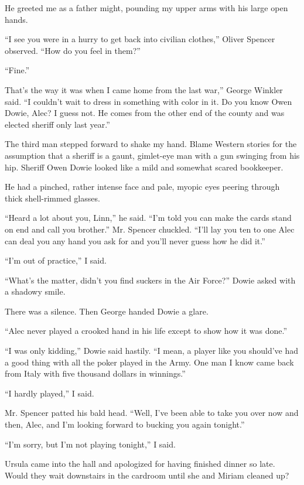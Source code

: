 \documentclass{novel}
\begin{document}
He greeted me as a father might, pounding my upper arms with his large open hands.

“I see you were in a hurry to get back into civilian clothes,” Oliver Spencer observed. “How do you feel in them?”

“Fine.”

That’s the way it was when I came home from the last war,” George Winkler said. “I couldn’t wait to dress in something with color in it. Do you know Owen Dowie, Alec? I guess not. He comes from the other end of the county and was elected sheriff only last year.”

\scenestars

The third man stepped forward to shake my hand. Blame Western stories for the assumption that a sheriff is a gaunt, gimlet-eye man with a gun swinging from his hip. Sheriff Owen Dowie looked like a mild and somewhat scared bookkeeper. 

He had a pinched, rather intense face and pale, myopic eyes peering through thick shell-rimmed glasses.

“Heard a lot about you, Linn,” he said. “I’m told you can make the cards stand on end and call you brother.” Mr. Spencer chuckled. “I’ll lay you ten to one Alec can deal you any hand you ask for and you’ll never guess how he did it.”

“I’m out of practice,” I said.

“What’s the matter, didn’t you find suckers in the Air Force?” Dowie asked with a shadowy smile.

There was a silence. Then George handed Dowie a glare.

“Alec never played a crooked hand in his life except to show how it was done.”

“I was only kidding,” Dowie said hastily. “I mean, a player like you should’ve had a good thing with all the poker played in the Army. One man I know came back from Italy with five thousand dollars in winnings.”

“I hardly played,” I said.

Mr. Spencer patted his bald head. “Well, I’ve been able to take you over now and then, Alec, and I’m looking forward to bucking you again tonight.”

“I’m sorry, but I’m not playing tonight,” I said.

Ursula came into the hall and apologized for having finished dinner so late. Would they wait downstairs in the cardroom until she and Miriam cleaned up? 
\end{document}
